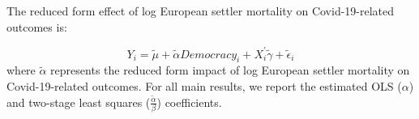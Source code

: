 
The reduced form effect of log European settler mortality on Covid-19-related outcomes is:

\begin{equation}
    \label{eqn:reduced}
    Y_i = \tilde{\mu} + \tilde{\alpha}Democracy_i + X^{'}_i\tilde{\gamma} + \tilde{\epsilon}_i
\end{equation}
where $\tilde{\alpha}$ represents the reduced form impact of log European settler mortality on Covid-19-related outcomes. For all main results, we report the estimated OLS ($\alpha$) and two-stage least squares ($\frac{\tilde{\alpha}}{\beta}$) coefficients. 

\begin{comment}
{\color{blue}
The intuition behind the empirical strategy is well captured by the migration histories of Detroit and Baltimore. Both were major destinations for black migrants during the Great Migration, and both were major industrial centers in 1940. However, black migrants arriving in these locations in 1940 came from parts of the South that experienced very different patterns of outmigra- tion between 1940 and 1970. Figure 4 depicts variation in black migration for these two cities. Detroit drew the plurality of its migrants from Alabama while Baltimore drew the plurality from Virginia. Migrants from Alabama tended to come from counties specialized in cotton production, and negative shocks to cotton spurred outmigration from these areas. Virginia, by contrast, was a major recipient of war production spending during World War II. War pro- duction jobs attracted black workers and consequently lowered outmigration rates. 
The empirical strategy generalizes from the example above and builds on a standard shift-share approach used to estimate local labor market impacts of migration (Altonji and Card, 1991). The technique was first adapted to the Great Migration context by Boustan (2010). Black southern migrants tended to move where previous migrants from their communities had settled, thus generating correlated origin-destination flows similar to those observed in the international migration context. Shocks to migrants’ origin locations (“push factors”) are plausibly orthogonal to shocks to the destinations (“pull factors”) that could also influence the location choices of future migrants. Interacting exogenous swings in migration at the origin level with historical migration patterns in the destinations yields a potential instrument for black population changes in the North.}


\end{comment}
